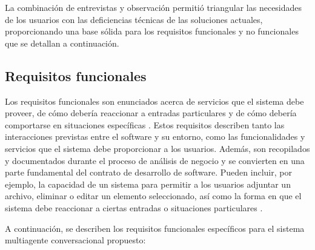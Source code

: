 La combinación de entrevistas y observación permitió triangular las necesidades de los usuarios con las deficiencias técnicas de las soluciones actuales, proporcionando una base sólida para los requisitos funcionales y no funcionales que se detallan a continuación.



\subsection{Requisitos funcionales}

Los requisitos funcionales son enunciados acerca de servicios que el sistema debe proveer, de cómo debería reaccionar a entradas particulares y de cómo debería comportarse en situaciones específicas \cite{sommerville2011software}. Estos requisitos describen tanto las interacciones previstas entre el software y su entorno, como las funcionalidades y servicios que el sistema debe proporcionar a los usuarios. Además, son recopilados y documentados durante el proceso de análisis de negocio y se convierten en una parte fundamental del contrato de desarrollo de software. Pueden incluir, por ejemplo, la capacidad de un sistema para permitir a los usuarios adjuntar un archivo, eliminar o editar un elemento seleccionado, así como la forma en que el sistema debe reaccionar a ciertas entradas o situaciones particulares \cite{chanchi2019propuesta}.

A continuación, se describen los requisitos funcionales específicos para el sistema multiagente conversacional propuesto:

